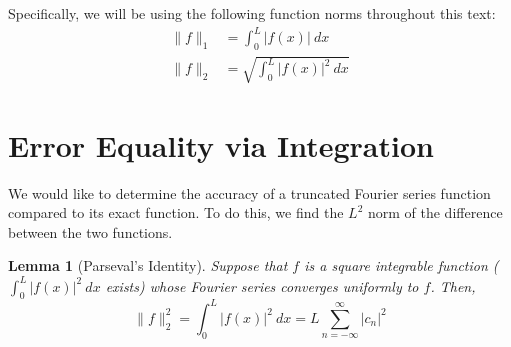 \documentclass{article}
\newtheorem{lemma}[theorem]{Lemma}
\begin{document}
Specifically, we will be using the following function norms throughout this text:
\begin{align}
    \lVert f \rVert_1 &= \int_{0}^{L} |f(x)|\ dx \\
    \lVert f \rVert_2 &= \sqrt{\int_{0}^{L} |f(x)|^2\ dx}
\end{align}

\section{Error Equality via Integration}

We would like to determine the accuracy of a truncated Fourier series function compared to its exact function. To do this, we find the $L^2$ norm of the difference between the two functions.

\begin{lemma}[Parseval's Identity]
    Suppose that $f$ is a square integrable function ($\int_{0}^{L} |f(x)|^2\ dx$ exists) whose Fourier series converges uniformly to $f$. Then,
    \begin{equation}
        \lVert f \rVert_2^2 = \int_{0}^{L} |f(x)|^2\ dx = L \sum_{n=-\infty}^{\infty} |c_n|^2
    \end{equation}
\end{lemma}
\end{document}
